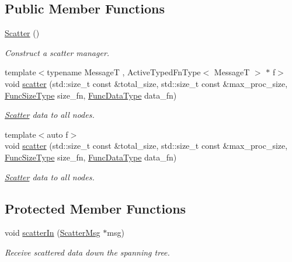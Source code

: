 \subsection*{Public Member Functions}
\begin{DoxyCompactItemize}
\item 
\hyperlink{structvt_1_1collective_1_1scatter_1_1_scatter_a33ea9a78c5d43dcea4ec2cb69d8b00b4}{Scatter} ()
\begin{DoxyCompactList}\small\item\em Construct a scatter manager. \end{DoxyCompactList}\item 
{\footnotesize template$<$typename MessageT , Active\+Typed\+Fn\+Type$<$ Message\+T $>$ $\ast$ f$>$ }\\void \hyperlink{structvt_1_1collective_1_1scatter_1_1_scatter_a0873f5fd4b890ad95e6ed6c097efe8bd}{scatter} (std\+::size\+\_\+t const \&total\+\_\+size, std\+::size\+\_\+t const \&max\+\_\+proc\+\_\+size, \hyperlink{structvt_1_1collective_1_1scatter_1_1_scatter_a977d895e42999a4078c6705ac851f447}{Func\+Size\+Type} size\+\_\+fn, \hyperlink{structvt_1_1collective_1_1scatter_1_1_scatter_a19da1fe0f7347a8e91f08b6a19fee781}{Func\+Data\+Type} data\+\_\+fn)
\begin{DoxyCompactList}\small\item\em \hyperlink{structvt_1_1collective_1_1scatter_1_1_scatter}{Scatter} data to all nodes. \end{DoxyCompactList}\item 
{\footnotesize template$<$auto f$>$ }\\void \hyperlink{structvt_1_1collective_1_1scatter_1_1_scatter_ab1993f3a5db651302eeca07d8aa739aa}{scatter} (std\+::size\+\_\+t const \&total\+\_\+size, std\+::size\+\_\+t const \&max\+\_\+proc\+\_\+size, \hyperlink{structvt_1_1collective_1_1scatter_1_1_scatter_a977d895e42999a4078c6705ac851f447}{Func\+Size\+Type} size\+\_\+fn, \hyperlink{structvt_1_1collective_1_1scatter_1_1_scatter_a19da1fe0f7347a8e91f08b6a19fee781}{Func\+Data\+Type} data\+\_\+fn)
\begin{DoxyCompactList}\small\item\em \hyperlink{structvt_1_1collective_1_1scatter_1_1_scatter}{Scatter} data to all nodes. \end{DoxyCompactList}\end{DoxyCompactItemize}
\subsection*{Protected Member Functions}
\begin{DoxyCompactItemize}
\item 
void \hyperlink{structvt_1_1collective_1_1scatter_1_1_scatter_aa80a957377cce3126058f3d7d30d2fed}{scatter\+In} (\hyperlink{structvt_1_1collective_1_1scatter_1_1_scatter_msg}{Scatter\+Msg} $\ast$msg)
\begin{DoxyCompactList}\small\item\em Receive scattered data down the spanning tree. \end{DoxyCompactList}\end{DoxyCompactItemize}
